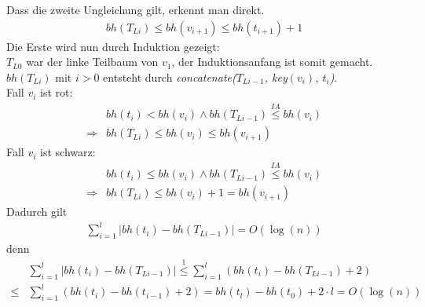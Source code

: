 \documentclass[a4paper,12pt]{article}
\begin{document}
  
  \noindent Dass die zweite Ungleichung gilt, erkennt man direkt. 
  \begin{align}
   \mathit{bh}(T_{Li}) \leq \mathit{bh}(v_{i+1}) \leq\mathit{bh}(t_{i+1}) + 1  
    \end{align}
   Die Erste wird nun durch Induktion gezeigt:\\
  $T_{L0}$ war der linke Teilbaum von $v_1$, der Induktionsanfang ist somit gemacht.\\
  $\mathit{bh}(T_{Li})$ mit $i > 0$  entsteht durch \textit{concatenate($T_{Li-1}$, \textit{key}$\left(v_i\right)$, $t_i$)}.\\ 
  Fall $v_i$ ist rot:
\begin{align*}
&\mathit{bh}(t_i) < \mathit{bh}(v_i)  \land  \mathit{bh}(T_{Li-1})  \overset{\textit{IA}}{\leq}  \mathit{bh}(v_{i}) \\
\Rightarrow  & \mathit{bh}(T_{Li})  \leq  \mathit{bh}(v_{i}) \leq  \mathit{bh}(v_{i+1}) 
\end{align*}
  Fall $v_i$ ist schwarz:
 \begin{align*}
  &\mathit{bh}(t_i) \leq \mathit{bh}(v_i)  \land  \mathit{bh}(T_{Li-1})  \overset{\textit{IA}}{\leq}  \mathit{bh}(v_{i}) \\
  \Rightarrow  &\mathit{bh}(T_{Li})  \leq \mathit{bh}(v_{i}) + 1 =    \mathit{bh}(v_{i+1})
\end{align*}
Dadurch gilt
\begin{align}
  \sum_{i = 1}^{l} \vert\mathit{bh} \left(t_{i} \right) -\mathit{bh} \left(T_{Li-1} \right) \vert =  O \left(\log \left(n \right) \right)
\end{align}
denn
 \begin{align*}
 &\sum_{i = 1}^{l} \vert\mathit{bh} \left(t_{i} \right) -\mathit{bh} \left(T_{Li-1} \right) \vert \overset{\textit{1}}{\leq}
 \sum_{i = 1}^{l} \left( \mathit{bh} \left(t_{i} \right) -\mathit{bh} \left(T_{Li-1} \right) + 2\right)\\
 \leq &\sum_{i = 1}^{l} \left( \mathit{bh} \left(t_{i} \right) -\mathit{bh} \left(t_{i-1} \right) + 2\right)
 =  \mathit{bh} \left(t_{l} \right) -\mathit{bh} \left(t_{0} \right) + 2 \cdot l  = O \left(\log \left(n \right) \right)
 \end{align*}
 
\end{document}
